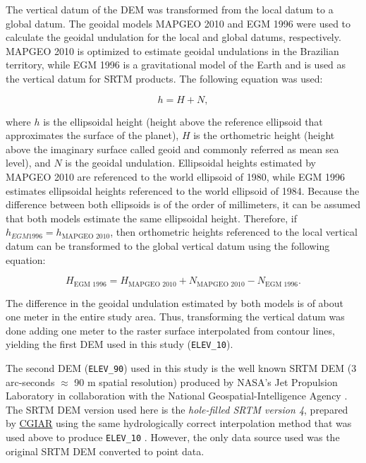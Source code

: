 The vertical datum of the DEM was transformed from the local datum to a global datum. The geoidal models MAPGEO 2010 \citep{IBGE2010a} and EGM 1996 \citep{LemoineEtAl1998} were used to calculate the geoidal undulation for the local and global datums, respectively. MAPGEO 2010 is optimized to estimate geoidal undulations in the Brazilian territory, while EGM 1996 is a gravitational model of the Earth and is used as the vertical datum for SRTM products. The following equation was used:

\begin{center}
  \label{eq:geoidal}
  \begin{equation}
    h = H + N,
  \end{equation}
\end{center}

\noindent where $h$ is the ellipsoidal height (height above the reference ellipsoid that approximates the surface of the planet), $H$ is the orthometric height (height above the imaginary surface called geoid and commonly referred as mean sea level), and $N$ is the geoidal undulation. Ellipsoidal heights estimated by MAPGEO 2010 are referenced to the world ellipsoid of 1980, while EGM 1996 estimates ellipsoidal heights referenced to the world ellipsoid of 1984. Because the difference between both ellipsoids is of the order of millimeters, it can be assumed that both models estimate the same ellipsoidal height. Therefore, if $h_{EGM 1996} = h_{\text{MAPGEO 2010}}$, then orthometric heights referenced to the local vertical datum can be transformed to the global vertical datum using the following equation:

\begin{center}
  \begin{equation}
    H_{\text{EGM 1996}} = H_{\text{MAPGEO 2010}} + N_{\text{MAPGEO 2010}} - N_{\text{EGM 1996}}.
  \end{equation}
\end{center}

The difference in the geoidal undulation estimated by both models is of about one meter in the entire study area. Thus, transforming the vertical datum was done adding one meter to the raster surface interpolated from contour lines, yielding the first DEM used in this study (\texttt{ELEV\_10}).

The second DEM (\texttt{ELEV\_90}) used in this study is the well known SRTM DEM (3 arc-seconds $\approx$ 90 m spatial resolution) produced by NASA’s Jet Propulsion Laboratory in collaboration with the National Geospatial-Intelligence Agency \citep{RodriguezEtAl2006}. The SRTM DEM version used here is the \textit{hole-filled SRTM version 4}, prepared by \href{http://www.cgiar.org/}{CGIAR} using the same hydrologically correct interpolation method that was used above to produce \texttt{ELEV\_10} \citep{ReuterEtAl2007, Jarvis2008}. However, the only data source used was the original SRTM DEM converted to point data.

